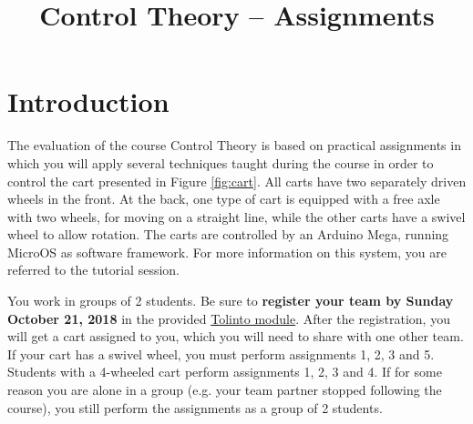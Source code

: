 \documentclass[10pt,a4paper]{article}
\title{\textbf{Control Theory -- Assignments}}
\date{\vspace{-5ex}}
\begin{document}
\maketitle

\section{Introduction}
The evaluation of the course Control Theory is based on practical assignments in which you will apply several techniques taught during the course in order to control the cart presented in Figure \ref{fig:cart}. All carts have two separately driven wheels in the front. At the back, one type of cart is equipped with a free axle with two wheels, for moving on a straight line, while the other carts have a swivel wheel to allow rotation. The carts are controlled by an Arduino Mega, running MicroOS as software framework. For more information on this system, you are referred to the tutorial session.

You work in groups of 2 students. Be sure to \textbf{register your team by Sunday October 21, 2018} in the provided \href{https://tolapps.kuleuven.be/Tolinto/event/9350079486_gII}{Tolinto module}. After the registration, you will get a cart assigned to you, which you will need to share with one other team. If your cart has a swivel wheel, you must perform assignments 1, 2, 3 and 5. Students with a 4-wheeled cart perform assignments 1, 2, 3 and 4. If for some reason you are alone in a group (e.g. your team partner stopped following the course), you still perform the assignments as a group of 2 students.
\end{document}
